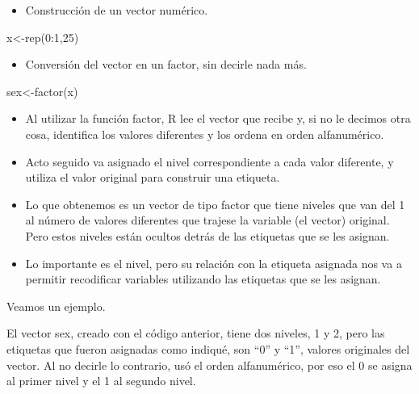 \documentclass[
  letterpaper,
  DIV=11,
  numbers=noendperiod]{scrreprt}
\newenvironment{Shaded}{\begin{snugshade}}{\end{snugshade}}
\newcommand{\DecValTok}[1]{\textcolor[rgb]{0.68,0.00,0.00}{#1}}
\newcommand{\FunctionTok}[1]{\textcolor[rgb]{0.28,0.35,0.67}{#1}}
\newcommand{\NormalTok}[1]{\textcolor[rgb]{0.00,0.23,0.31}{#1}}
\newcommand{\OtherTok}[1]{\textcolor[rgb]{0.00,0.23,0.31}{#1}}
\newcommand{\SpecialCharTok}[1]{\textcolor[rgb]{0.37,0.37,0.37}{#1}}
\providecommand{\tightlist}{%
  \setlength{\itemsep}{0pt}\setlength{\parskip}{0pt}}\usepackage{longtable,booktabs,array}
\begin{document}
\begin{itemize}
\tightlist
\item
  Construcción de un vector numérico.
\end{itemize}

\begin{Shaded}
\begin{Highlighting}[]
\NormalTok{x}\OtherTok{\textless{}{-}}\FunctionTok{rep}\NormalTok{(}\DecValTok{0}\SpecialCharTok{:}\DecValTok{1}\NormalTok{,}\DecValTok{25}\NormalTok{)}
\end{Highlighting}
\end{Shaded}

\begin{itemize}
\tightlist
\item
  Conversión del vector en un factor, sin decirle nada más.
\end{itemize}

\begin{Shaded}
\begin{Highlighting}[]
\NormalTok{sex}\OtherTok{\textless{}{-}}\FunctionTok{factor}\NormalTok{(x)}
\end{Highlighting}
\end{Shaded}

\begin{itemize}
\item
  Al utilizar la función factor, R lee el vector que recibe y, si no le
  decimos otra cosa, identifica los valores diferentes y los ordena en
  orden alfanumérico.
\item
  Acto seguido va asignado el nivel correspondiente a cada valor
  diferente, y utiliza el valor original para construir una etiqueta.
\item
  Lo que obtenemos es un vector de tipo factor que tiene niveles que van
  del 1 al número de valores diferentes que trajese la variable (el
  vector) original. Pero estos niveles están ocultos detrás de las
  etiquetas que se les asignan.
\item
  Lo importante es el nivel, pero su relación con la etiqueta asignada
  nos va a permitir recodificar variables utilizando las etiquetas que
  se les asignan.
\end{itemize}

Veamos un ejemplo.

El vector sex, creado con el código anterior, tiene dos niveles, 1 y 2,
pero las etiquetas que fueron asignadas como indiqué, son ``0'' y ``1'',
valores originales del vector. Al no decirle lo contrario, usó el orden
alfanumérico, por eso el 0 se asigna al primer nivel y el 1 al segundo
nivel.
\end{document}

